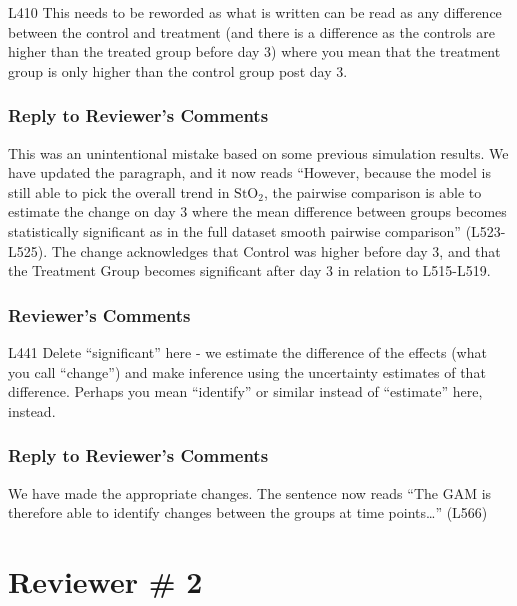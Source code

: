 \documentclass[
]{article}
\begin{document}
L410 This needs to be reworded as what is written can be read as any difference between the control and treatment (and there is a difference as the controls are higher than the treated group before day 3) where you mean that the treatment group is only higher than the control group post day 3.

\hypertarget{section-37}{%
\subsubsection{\texorpdfstring{\textcolor{reviewersblue} {Reply to Reviewer's Comments}}{}}\label{section-37}}

This was an unintentional mistake based on some previous simulation results. We have updated the paragraph, and it now reads ``However, because the model is still able to pick the overall trend in \(\mbox{StO}_2\), the pairwise comparison is able to estimate the change on day 3 where the mean difference between groups becomes statistically significant as in the full dataset smooth pairwise comparison'' (L523-L525). The change acknowledges that Control was higher before day 3, and that the Treatment Group becomes significant after day 3 in relation to L515-L519.

\hypertarget{reviewers-comments-37}{%
\subsubsection{Reviewer's Comments}\label{reviewers-comments-37}}

L441 Delete ``significant'' here - we estimate the difference of the effects (what you call ``change'') and make inference using the uncertainty estimates of that difference. Perhaps you mean ``identify'' or similar instead of ``estimate'' here, instead.

\hypertarget{section-38}{%
\subsubsection{\texorpdfstring{\textcolor{reviewersblue} {Reply to Reviewer's Comments}}{}}\label{section-38}}

We have made the appropriate changes. The sentence now reads ``The GAM is therefore able to identify changes between the groups at time points\ldots{}'' (L566)

\hypertarget{reviewer-2}{%
\section{Reviewer \# 2}\label{reviewer-2}}
\end{document}
